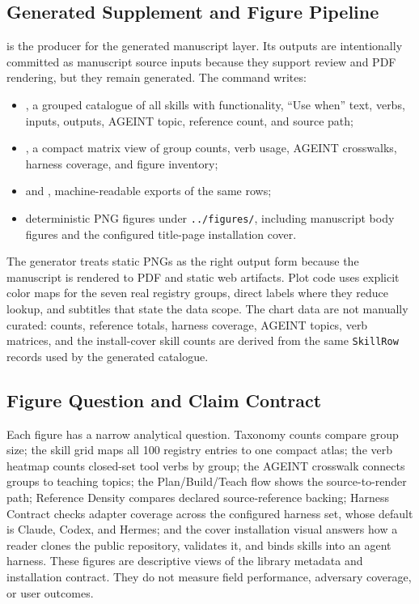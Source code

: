 \documentclass[
]{article}
\providecommand{\tightlist}{%
  \setlength{\itemsep}{0pt}\setlength{\parskip}{0pt}}
\begin{document}
\subsection{Generated Supplement and Figure
Pipeline}\label{generated-supplement-and-figure-pipeline}

is the producer for the generated manuscript layer. Its outputs are
intentionally committed as manuscript source inputs because they support
review and PDF rendering, but they remain generated. The command writes:

\begin{itemize}
\tightlist
\item
  , a grouped catalogue of
  all skills with functionality, ``Use when'' text, verbs, inputs,
  outputs, AGEINT topic, reference count, and source path;
\item
  , a compact matrix
  view of group counts, verb usage, AGEINT crosswalks, harness coverage,
  and figure inventory;
\item
   and
  , machine-readable exports of
  the same rows;
\item
  deterministic PNG figures under \texttt{../figures/}, including
  manuscript body figures and the configured title-page installation
  cover.
\end{itemize}

The generator treats static PNGs as the right output form because the
manuscript is rendered to PDF and static web artifacts. Plot code uses
explicit color maps for the seven real registry groups, direct labels
where they reduce lookup, and subtitles that state the data scope. The
chart data are not manually curated: counts, reference totals, harness
coverage, AGEINT topics, verb matrices, and the install-cover skill
counts are derived from the same \texttt{SkillRow} records used by the
generated catalogue.

\subsection{Figure Question and Claim
Contract}\label{figure-question-and-claim-contract}

Each figure has a narrow analytical question. Taxonomy counts compare
group size; the skill grid maps all 100 registry entries to one compact
atlas; the verb heatmap counts closed-set tool verbs by group; the
AGEINT crosswalk connects groups to teaching topics; the
Plan/Build/Teach flow shows the source-to-render path; Reference Density
compares declared source-reference backing; Harness Contract checks
adapter coverage across the configured harness set, whose default is
Claude, Codex, and Hermes; and the cover installation visual answers how
a reader clones the public repository, validates it, and binds skills
into an agent harness. These figures are descriptive views of the
library metadata and installation contract. They do not measure field
performance, adversary coverage, or user outcomes.
\end{document}
